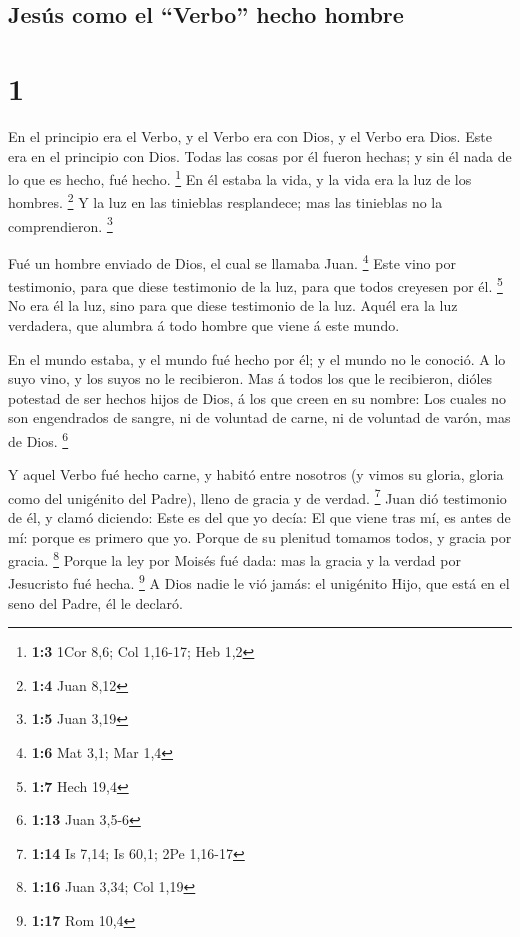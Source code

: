 \hypertarget{jesuxfas-como-el-verbo-hecho-hombre}{%
\subsection{Jesús como el ``Verbo'' hecho
hombre}\label{jesuxfas-como-el-verbo-hecho-hombre}}

\hypertarget{section}{%
\section{1}\label{section}}

 En el principio era el Verbo, y el Verbo era con Dios, y
el Verbo era Dios.  Este era en el principio con Dios.
 Todas las cosas por él fueron hechas; y sin él nada de lo
que es hecho, fué hecho. \footnote{\textbf{1:3} 1Cor 8,6; Col 1,16-17;
  Heb 1,2}  En él estaba la vida, y la vida era la luz de
los hombres. \footnote{\textbf{1:4} Juan 8,12}  Y la luz
en las tinieblas resplandece; mas las tinieblas no la comprendieron.
\footnote{\textbf{1:5} Juan 3,19}

 Fué un hombre enviado de Dios, el cual se llamaba Juan.
\footnote{\textbf{1:6} Mat 3,1; Mar 1,4}  Este vino por
testimonio, para que diese testimonio de la luz, para que todos creyesen
por él. \footnote{\textbf{1:7} Hech 19,4}  No era él la
luz, sino para que diese testimonio de la luz.  Aquél era
la luz verdadera, que alumbra á todo hombre que viene á este mundo.

 En el mundo estaba, y el mundo fué hecho por él; y el
mundo no le conoció.  A lo suyo vino, y los suyos no le
recibieron.  Mas á todos los que le recibieron, dióles
potestad de ser hechos hijos de Dios, á los que creen en su nombre:
 Los cuales no son engendrados de sangre, ni de voluntad
de carne, ni de voluntad de varón, mas de Dios. \footnote{\textbf{1:13}
  Juan 3,5-6}

 Y aquel Verbo fué hecho carne, y habitó entre nosotros
(y vimos su gloria, gloria como del unigénito del Padre), lleno de
gracia y de verdad. \footnote{\textbf{1:14} Is 7,14; Is 60,1; 2Pe
  1,16-17}  Juan dió testimonio de él, y clamó diciendo:
Este es del que yo decía: El que viene tras mí, es antes de mí: porque
es primero que yo.  Porque de su plenitud tomamos todos,
y gracia por gracia. \footnote{\textbf{1:16} Juan 3,34; Col 1,19}
 Porque la ley por Moisés fué dada: mas la gracia y la
verdad por Jesucristo fué hecha. \footnote{\textbf{1:17} Rom 10,4}
 A Dios nadie le vió jamás: el unigénito Hijo, que está
en el seno del Padre, él le declaró.

